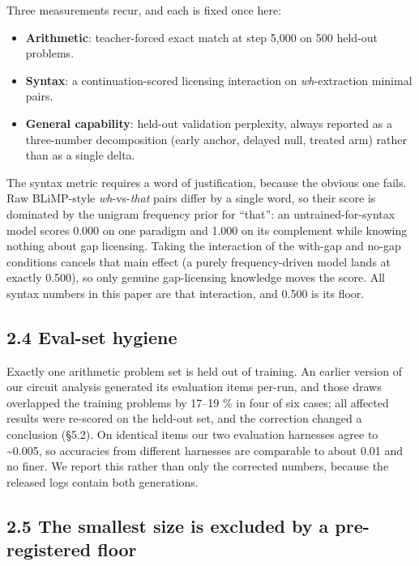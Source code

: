 \documentclass[11pt]{article}
\providecommand{\tightlist}{\setlength{\itemsep}{0pt}\setlength{\parskip}{0pt}}
\begin{document}
Three measurements recur, and each is fixed once here:

\begin{itemize}
\tightlist
\item
  \textbf{Arithmetic}: teacher-forced exact match at step 5,000 on 500 held-out problems.
\item
  \textbf{Syntax}: a continuation-scored licensing interaction on \emph{wh}-extraction minimal pairs.
\item
  \textbf{General capability}: held-out validation perplexity, always reported as a three-number
  decomposition (early anchor, delayed null, treated arm) rather than as a single delta.
\end{itemize}

The syntax metric requires a word of justification, because the obvious one fails. Raw
BLiMP-style \emph{wh}-vs-\emph{that} pairs differ by a single word, so their score is dominated by the
unigram frequency prior for ``that'': an untrained-for-syntax model scores 0.000 on one
paradigm and 1.000 on its complement while knowing nothing about gap licensing. Taking the
interaction of the with-gap and no-gap conditions cancels that main effect (a purely
frequency-driven model lands at exactly 0.500), so only genuine gap-licensing knowledge moves
the score. All syntax numbers in this paper are that interaction, and 0.500 is its floor.

\subsection{2.4 Eval-set hygiene}\label{eval-set-hygiene}

Exactly one arithmetic problem set is held out of training. An earlier version of our circuit
analysis generated its evaluation items per-run, and those draws overlapped the training
problems by 17--19 \% in four of six cases; all affected results were re-scored on the held-out
set, and the correction changed a conclusion (§5.2). On identical items our two evaluation
harnesses agree to \textasciitilde0.005, so accuracies from different harnesses are comparable to about
0.01 and no finer. We report this rather than only the corrected numbers, because the
released logs contain both generations.

\subsection{2.5 The smallest size is excluded by a pre-registered floor}\label{the-smallest-size-is-excluded-by-a-pre-registered-floor}
\end{document}

